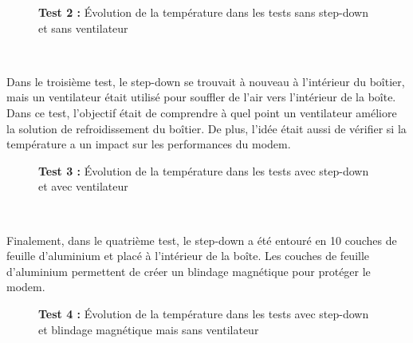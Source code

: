 \begin{figure}[ht!]
  \centering
  
  \label{fig:test_2}
  \vspace{-1cm}
  \caption{\textbf{Test 2 :} Évolution de la température dans les tests sans step-down et sans ventilateur}
\end{figure}

~

\noindent
Dans le troisième test, le step-down se trouvait à nouveau à l’intérieur du boîtier, mais un ventilateur était utilisé pour souffler de l’air vers l’intérieur de la boîte. Dans ce test, l’objectif était de comprendre à quel point un ventilateur améliore la solution de refroidissement du boîtier. De plus, l’idée était aussi de vérifier si la température a un impact sur les performances du modem.

\begin{figure}[ht!]
  \centering
  
  \label{fig:test_3}
  \vspace{-1cm}
  \caption{\textbf{Test 3 :} Évolution de la température dans les tests avec step-down et avec ventilateur}
\end{figure}

~

\noindent
Finalement, dans le quatrième test, le step-down a été entouré en 10 couches de feuille d’aluminium et placé à l’intérieur de la boîte. Les couches de feuille d’aluminium permettent de créer un blindage magnétique pour protéger le modem.


\begin{figure}[h!]
  \centering
  
  \label{fig:test_4}
  \vspace{-0.2cm}
  \caption{\textbf{Test 4 :} Évolution de la température dans les tests avec step-down et blindage magnétique mais sans ventilateur}
\end{figure}


